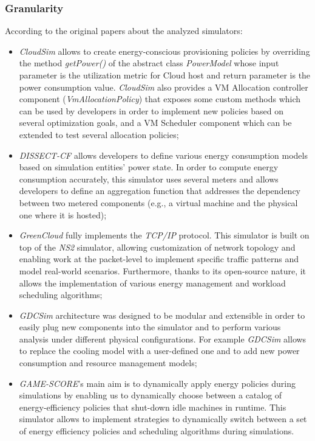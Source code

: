 {\subsubsection{Granularity}
According to the original papers about the analyzed simulators:
\begin{itemize}
\item \emph{CloudSim} allows to create energy-conscious provisioning policies by overriding the method \emph{getPower()} of the abstract class \emph{PowerModel} whose input parameter is the utilization metric for Cloud host and return parameter is the power consumption value. \emph{CloudSim} also provides a VM Allocation controller component (\emph{VmAllocationPolicy}) that exposes some custom methods which can be used by developers in order to implement new policies based on several optimization goals, and a VM Scheduler component which can be extended to test several allocation policies;
\item \emph{DISSECT-CF} allows developers to define various energy consumption models based on simulation entities' power state. In order to compute energy consumption accurately, this simulator uses several meters and allows developers to define an aggregation function that addresses the dependency between two metered components (e.g., a virtual machine and the physical one where it is hosted);
\item \emph{GreenCloud} fully implements the \emph{TCP/IP} protocol. This simulator is built on top of the \emph{NS2} simulator, allowing customization of network topology and enabling work at the packet-level to implement specific traffic patterns and model real-world scenarios. Furthermore, thanks to its open-source nature, it allows the implementation of various energy management and workload scheduling algorithms;
\item \emph{GDCSim} architecture was designed to be modular and extensible in order to easily plug new components into the simulator and to perform various analysis under different physical configurations. For example \emph{GDCSim} allows to replace the cooling model with a user-defined one and to add new power consumption and resource management models;
\item \emph{GAME-SCORE}'s main aim is to dynamically apply energy policies during simulations by enabling us to dynamically choose between a catalog of energy-efficiency policies that shut-down idle machines in runtime. This simulator allows to implement strategies to dynamically switch between a set of energy efficiency policies and scheduling algorithms during simulations.
\end{itemize}

}
